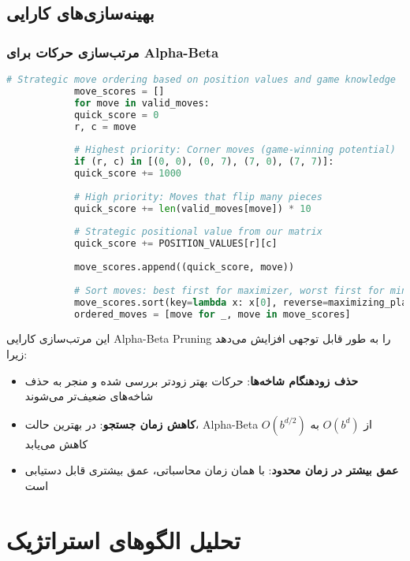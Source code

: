 \documentclass[12pt]{article}
\newenvironment{ltrcode}{\lr\bgroup}{\egroup}
\begin{document}
	\subsection{بهینه‌سازی‌های کارایی}
	
	\subsubsection{مرتب‌سازی حرکات برای Alpha-Beta}
	
	\begin{ltrcode}
		\begin{lstlisting}[language=Python, caption=Move Ordering for Efficient Pruning]
			# Strategic move ordering based on position values and game knowledge
			move_scores = []
			for move in valid_moves:
			quick_score = 0
			r, c = move
			
			# Highest priority: Corner moves (game-winning potential)
			if (r, c) in [(0, 0), (0, 7), (7, 0), (7, 7)]:
			quick_score += 1000
			
			# High priority: Moves that flip many pieces
			quick_score += len(valid_moves[move]) * 10
			
			# Strategic positional value from our matrix
			quick_score += POSITION_VALUES[r][c]
			
			move_scores.append((quick_score, move))
			
			# Sort moves: best first for maximizer, worst first for minimizer
			move_scores.sort(key=lambda x: x[0], reverse=maximizing_player)
			ordered_moves = [move for _, move in move_scores]
		\end{lstlisting}
	\end{ltrcode}
	
	این مرتب‌سازی کارایی Alpha-Beta Pruning را به طور قابل توجهی افزایش می‌دهد زیرا:
	
	\begin{itemize}
		\item \textbf{حذف زودهنگام شاخه‌ها}: حرکات بهتر زودتر بررسی شده و منجر به حذف شاخه‌های ضعیف‌تر می‌شوند
		\item \textbf{کاهش زمان جستجو}: در بهترین حالت، Alpha-Beta از $O(b^d)$ به $O(b^{d/2})$ کاهش می‌یابد
		\item \textbf{عمق بیشتر در زمان محدود}: با همان زمان محاسباتی، عمق بیشتری قابل دستیابی است
	\end{itemize}
	
	\section{تحلیل الگوهای استراتژیک}
	
\end{document}
